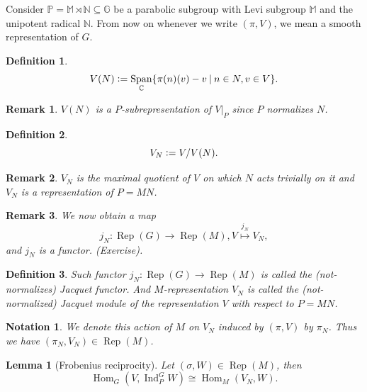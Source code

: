 \documentclass[8pt]{article}
\newtheorem{definition}{Definition}[section]
\newtheorem{lemma}{Lemma}[section]
\newtheorem{notation}{Notation}[section]
\newtheorem{remark}{Remark}[section]
\DeclareMathOperator{\Ind}{Ind}
\DeclareMathOperator{\Rep}{Rep}
\DeclareMathOperator{\Hom}{Hom}
\DeclareMathOperator{\Span}{Span}
\newcommand{\defeq}{\vcentcolon=}
\newcommand{\N}[0]{\mathbb{N}}
\newcommand{\C}[0]{\mathbb{C}}
\newcommand{\G}[0]{\mathbb{G}}
\newcommand{\Para}[0]{\mathbb{P}}
\newcommand{\M}[0]{\mathbb{M}}
\newcommand{\sep}[0]{\:|\:}
\begin{document}
Consider $\Para = \M\rtimes \N\subseteq\G$ be a parabolic subgroup with Levi subgroup $\M$ and the unipotent radical $\N$. From now on whenever we write $(\pi,V)$, we mean a smooth representation of $G$.

\begin{definition}
  \begin{equation*}
    V(N) \defeq \Span_\C\{\pi(n)(v) - v\sep n\in N,v\in V\}.
  \end{equation*}
\end{definition}

\begin{remark}
  $V(N)$ is a $P$-subrepresentation of $V|_P$ since $P$ normalizes $N$.
\end{remark}

\begin{definition}
  \begin{equation*}
    V_N\defeq V/V(N).
  \end{equation*}
\end{definition}

\begin{remark}
  $V_N$ is the maximal quotient of $V$ on which $N$ acts trivially on it and $V_N$ is a representation of $P=MN$.
\end{remark}

\begin{remark}
  We now obtain a map 
  \begin{equation*}
    j_N:\Rep(G)\to\Rep(M),V\stackrel{j_N}{\mapsto} V_N,
  \end{equation*}
  and $j_N$ is a functor. (Exercise).
\end{remark}

\begin{definition}
  Such functor $j_N:\Rep(G)\to\Rep(M)$ is called the (not-normalizes) Jacquet functor. And $M$-representation $V_N$ is called the (not-normalized) Jacquet module of the representation $V$ with respect to $P=MN$.
\end{definition}

\begin{notation}
  We denote this action of $M$ on $V_N$ induced by $(\pi,V)$ by $\pi_N$. Thus we have $(\pi_N,V_N)\in\Rep(M)$.
\end{notation}

\begin{lemma}[Frobenius reciprocity]
  \label{lemma_42}
  Let $(\sigma,W)\in\Rep(M)$, then 
  \begin{equation*}
    \Hom_G(V,\Ind_P^GW) \cong \Hom_M(V_N,W).
  \end{equation*}
\end{lemma}
\end{document}
